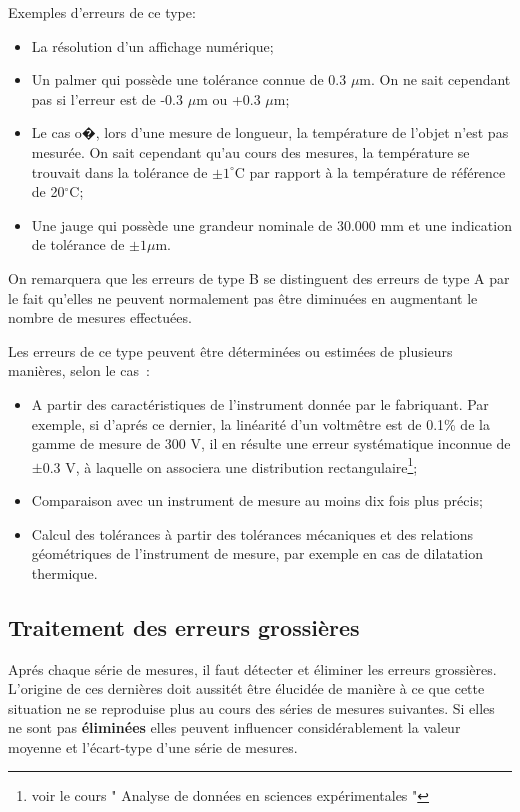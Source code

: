 Exemples d'erreurs de ce type:
\begin{itemize}\itemsep2pt
\renewcommand{\labelitemi}{$\bullet$}
\item La résolution d'un affichage numérique;
\item Un palmer qui possède une tolérance connue de 0.3 $\mu$m. On ne sait cependant pas si l'erreur est de -0.3 $\mu$m ou +0.3 $\mu$m;
\item Le cas o�, lors d'une mesure de longueur, la température de l'objet n'est pas mesurée. On sait cependant qu'au cours des mesures, la température se trouvait dans la tolérance de $\pm1^{\circ}$C par rapport à la température de référence de 20$^{\circ}$C;
\item Une jauge qui possède une grandeur nominale de 30.000 mm et une indication de tolérance de $\pm 1\mu$m.
\end{itemize}
On remarquera que les erreurs de type B se distinguent des erreurs de type A par le fait qu'elles ne peuvent normalement pas être diminuées en augmentant le nombre de mesures effectuées.

Les erreurs de ce type peuvent être déterminées ou estimées de plusieurs manières, selon le cas~:
\begin{itemize}\itemsep2pt
\renewcommand{\labelitemi}{$\bullet$}
\item A partir des caractéristiques de l'instrument donnée par le fabriquant. Par exemple, si d'aprés ce dernier, la linéarité d'un voltmêtre est de 0.1\% de la gamme de mesure de 300 V, il en résulte une erreur systématique inconnue de $\pm$0.3 V, à laquelle on associera une distribution rectangulaire\footnote{voir le cours " Analyse de données en sciences expérimentales "};
\item Comparaison avec un instrument de mesure au moins dix fois plus précis;
\item Calcul des tolérances à partir des tolérances mécaniques et des relations géométriques de l'instrument de mesure, par exemple en cas de dilatation thermique.
\end{itemize}

\subsection{Traitement des erreurs grossières}

Aprés chaque série de mesures, il faut détecter et éliminer les erreurs grossières. L'origine de ces dernières doit aussitét être élucidée de manière à ce que cette situation ne se reproduise plus au cours des séries de mesures suivantes. Si elles ne sont pas \textbf{éliminées} elles peuvent influencer considérablement la valeur moyenne et l'écart-type d'une série de mesures.

